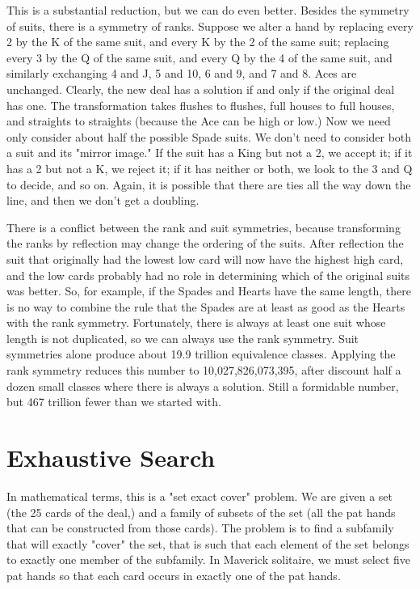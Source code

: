 \documentclass [12pt, letterpaper] {article}
\begin{document}
This is a substantial reduction, but we can do even better.  Besides the symmetry of suits, there is a symmetry of ranks.
Suppose we alter a hand by replacing every 2 by the K of the same suit, and every K by the 2 of the same suit; replacing
every 3 by the Q of the same suit, and every Q by the 4 of the same suit, and similarly exchanging 4 and J, 5 and 10, 6 and 9, and 7 and 8.
Aces are unchanged.  Clearly, the new deal has a solution if and only if the original deal has one.  The transformation takes flushes to 
flushes, full houses to full houses, and straights to straights (because the Ace can be high or low.)  
Now we need only consider about half the possible Spade suits.  We don't need to consider both a
suit and its "mirror image."  If the suit has a King but not a 2, we accept it; if it has a 2 but not a K, we reject it; if it has neither or both, 
we look to the 3 and Q to decide, and so on.  Again, it is possible that there are ties all the way down the line, and then we 
don't get a doubling.

There is a conflict between the rank and suit symmetries, because transforming the ranks by reflection may change the ordering of the suits.  After reflection
the suit that originally had the lowest low card will now have the highest high card, and the low cards probably had no role in determining
which of the original suits was better.  So, for example, if the Spades and Hearts have the same length, there is no way to combine the rule 
that the Spades are at least as good as the Hearts with the rank symmetry.  Fortunately, there is always at least one suit whose length is not
duplicated, so we can always use the rank symmetry.   Suit symmetries alone produce about 19.9 trillion equivalence 
classes.  Applying the rank symmetry reduces this number to 10,027,826,073,395, after discount half a dozen small classes where 
there is always a solution.  Still a formidable number, but 467 trillion fewer than we started with.

\section*{Exhaustive Search}

In mathematical terms, this is a "set exact cover" problem.  We are given a set (the 25 cards of the deal,) 
and a family of subsets of the set (all the pat hands that can be constructed from those cards).  The problem is 
to find a subfamily that will exactly "cover" the set, that is such that each element of the set belongs to exactly 
one member of the subfamily.  In Maverick solitaire, we must select five pat hands so that each card occurs 
in exactly one of the pat hands.
\end{document}
